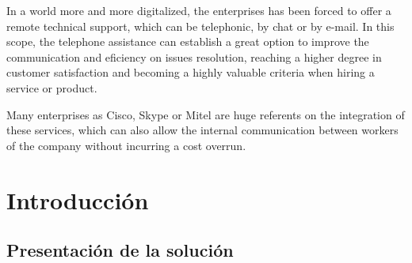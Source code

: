 \documentclass[a4paper, 12pt]{book}
\begin{document}
In a world more and more digitalized, the enterprises has been forced to offer a remote technical support, which can be telephonic, by chat or by e-mail. In this scope, the telephone assistance can establish a great option to improve the communication and eficiency on issues resolution, reaching a higher degree in customer satisfaction and becoming a highly valuable criteria when hiring a service or product.

Many enterprises as Cisco, Skype or Mitel are huge referents on the integration of these services, which can also allow the internal communication between workers of the company without incurring a cost overrun.



\tableofcontents
\cleardoublepage
\listoffigures %



\cleardoublepage
\chapter{Introducción}
\label{sec:intro} %

\section{Presentación de la solución}
\label{sec:seccion}
\end{document}
